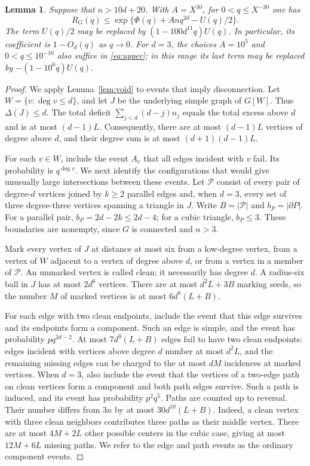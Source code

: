 \documentclass[11pt,reqno]{amsart}
\newtheorem{lemma}[theorem]{Lemma}
\theoremstyle{remark}
\numberwithin{equation}{section}
\begin{document}
\begin{lemma}\label{lem:upper}
Suppose that $n>10d+20$. With $A=X^{30}$, for
$0<q\le X^{-30}$ one has
\begin{equation}\label{eq:upper}
 R_G(q)\le
 \exp\bigl\{\Phi(q)+Anq^{2d}-U(q)/2\bigr\}.
\end{equation}
The term $U(q)/2$ may be replaced by
$(1-100d^{11}q)U(q)$. In particular, its coefficient is
$1-O_d(q)$ as $q\to0$.
For $d=3$, the choices $A=10^5$ and $0<q\le10^{-10}$ also
suffice in \eqref{eq:upper}; in this range its last term may be
replaced by $-(1-10^6q)U(q)$.
\end{lemma}

\begin{proof}
We apply Lemma~\ref{lem:void} to events that imply disconnection.
Let $W=\{v:\deg v\le d\}$, and let $J$ be the underlying simple
graph of $G[W]$. Thus $\Delta(J)\le d$. The total deficit
$\sum_{j<d}(d-j)n_j$ equals the total excess above $d$ and is at
most $(d-1)L$. Consequently, there are at most $(d-1)L$ vertices
of degree above $d$, and their degree sum is at most
$(d+1)(d-1)L$.

For each $v\in W$, include the event $A_v$ that all edges incident
with $v$ fail. Its probability is $q^{\deg v}$. We next identify
the configurations that would give unusually large intersections
between these events. Let $\mathcal P$ consist of every pair of
degree-$d$ vertices joined by $k\ge2$ parallel edges and, when
$d=3$, every set of three degree-three vertices spanning a triangle
in $J$. Write $B=|\mathcal P|$ and $b_P=|\partial P|$.
For a parallel pair, $b_P=2d-2k\le2d-4$; for a cubic triangle,
$b_P\le3$. These boundaries are nonempty, since $G$ is connected
and $n>3$.

Mark every vertex of $J$ at distance at most six from a low-degree
vertex, from a vertex of $W$ adjacent to a vertex of degree above
$d$, or from a vertex in a member of $\mathcal P$. An unmarked
vertex is called clean; it necessarily has degree $d$. A radius-six
ball in $J$ has at most $2d^6$ vertices. There are at most
$d^2L+3B$ marking seeds, so the number $M$ of marked vertices is
at most $6d^8(L+B)$.

For each edge with two clean endpoints, include the event that this
edge survives and its endpoints form a component. Such an edge is
simple, and the event has probability $pq^{2d-2}$. At most
$7d^9(L+B)$ edges fail to have two clean endpoints: edges incident
with vertices above degree $d$ number at most $d^2L$, and the
remaining missing edges can be charged to the at most $dM$
incidences at marked vertices. When $d=3$, also include the event
that the vertices of a two-edge path on clean vertices form a
component and both path edges survive. Such a path is induced,
and its event has probability $p^2q^5$. Paths are counted up to
reversal. Their number differs from $3n$ by at most
$30d^{10}(L+B)$. Indeed, a clean vertex with three clean neighbors
contributes three paths as their middle vertex. There are at most
$4M+2L$ other possible centers in the cubic case, giving at most
$12M+6L$ missing paths. We refer to the edge and path events as
the ordinary component events.


\end{proof}
\end{document}
